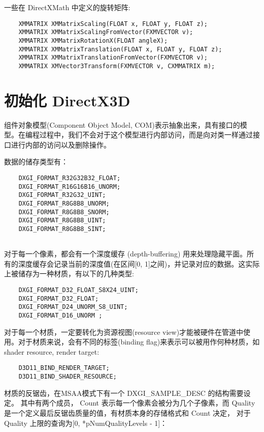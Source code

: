 \documentclass[10pt, a4paper]{article}
\begin{document}
    一些在 DirectXMath 中定义的旋转矩阵: 
\begin{lstlisting}
    XMMATRIX XMMatrixScaling(FLOAT x, FLOAT y, FLOAT z); 
    XMMATRIX XMMatrixScalingFromVector(FXMVECTOR v); 
    XMMATRIX XMMatrixRotationX(FLOAT angleX);
    XMMATRIX XMMatrixTranslation(FLOAT x, FLOAT y, FLOAT z);
    XMMATRIX XMMatrixTranslationFromVector(FXMVECTOR v); 
    XMMATRIX XMVector3Transform(FXMVECTOR v, CXMMATRIX m);  
\end{lstlisting}
\newpage 

\section{初始化 DirectX3D}
    组件对象模型(Component Object Model, COM)表示抽象出来，具有接口的模型。在编程过程中，我们不会对于这个模型进行内部访问，而是向对类一样通过接口进行内部的访问以及删除操作。 

    数据的储存类型有： 

\begin{lstlisting}
    DXGI_FORMAT_R32G32B32_FLOAT;
    DXGI_FORMAT_R16G16B16_UNORM;
    DXGI_FORMAT_R32G32_UINT;
    DXGI_FORMAT_R8G8B8_UNORM;
    DXGI_FORMAT_R8G8B8_SNORM;
    DXGI_FORMAT_R8G8B8_UINT;
    DXGI_FORMAT_R8G8B8_SINT;
    
\end{lstlisting}

    对于每一个像素，都会有一个深度缓存 (depth-buffering) 用来处理隐藏平面。所有的深度缓存会记录当前的深度值(在区间[0, 1]之间)，并记录对应的数据。这实际上被储存为一种材质，有以下的几种类型:
\begin{lstlisting}
    DXGI_FORMAT_D32_FLOAT_S8X24_UINT; 
    DXGI_FORMAT_D32_FLOAT;
    DXGI_FORMAT_D24_UNORM_S8_UINT;
    DXGI_FORMAT_D16_UNORM ;
\end{lstlisting} 

    对于每一个材质，一定要转化为资源视图(resource view)才能被硬件在管道中使用。对于材质来说，会有不同的标签(binding flag)来表示可以被用作何种材质，如 shader resource, render target:
\begin{lstlisting}
    D3D11_BIND_RENDER_TARGET; 
    D3D11_BIND_SHADER_RESOURCE; 
\end{lstlisting}

    材质的反锯齿，在MSAA模式下有一个 DXGI\_SAMPLE\_DESC 的结构需要设定。 其中有两个成员， Count 表示每一个像素会被分为几个子像素，而 Quality 是一个定义最后反锯齿质量的值，有材质本身的存储格式和 Count 决定， 对于 Quality 上限的查询为[0, *pNumQualityLevels - 1]： 
\end{document}
